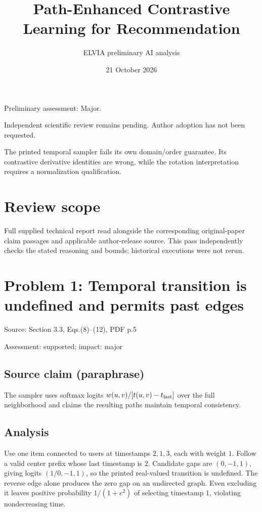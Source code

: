 \documentclass[11pt]{article}
\begin{document}
\title{Path-Enhanced Contrastive Learning for Recommendation}

\author{ELVIA preliminary AI analysis}\date{21 October 2026}\maketitle

Preliminary assessment: Major.\par

Independent scientific review remains pending. Author adoption has not been requested.

The printed temporal sampler fails its own domain/order guarantee. Its contrastive derivative identities are wrong, while the rotation interpretation requires a normalization qualification.

\section*{Review scope}

Full supplied technical report read alongside the corresponding original-paper claim passages and applicable author-release source. This pass independently checks the stated reasoning and bounds; historical executions were not rerun.

\section*{Problem 1: Temporal transition is undefined and permits past edges}

Source: Section 3.3, Eqs.(8)–(12), PDF p.5

Assessment: supported; impact: major

\subsection*{Source claim (paraphrase)}

The sampler uses softmax logits \(w(u,v)/[t(u,v)-t_{\rm last}]\) over the full neighborhood and claims the resulting paths maintain temporal consistency.

\subsection*{Analysis}

Use one item connected to users at timestamps \(2,1,3\), each with weight \(1\). Follow a valid center prefix whose last timestamp is \(2\). Candidate gaps are \((0,-1,1)\), giving logits \((1/0,-1,1)\), so the printed real-valued transition is undefined. The reverse edge alone produces the zero gap on an undirected graph. Even excluding it leaves positive probability \(1/(1+e^2)\) of selecting timestamp \(1\), violating nondecreasing time.
\end{document}
